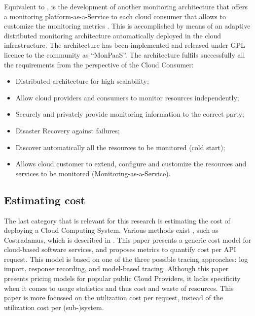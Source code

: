 \noindent
Equivalent to \cite{aktas2018hybrid}, is the development of another monitoring architecture that offers a monitoring platform-as-a-Service to each cloud consumer that allows to customize the monitoring metrics \cite{calero2014monpaas}. This is accomplished by means of an adaptive distributed monitoring architecture automatically deployed in the cloud infrastructure. The architecture has been implemented and released under GPL licence to the community as ``MonPaaS''. The architecture fulfils successfully all the requirements from the perspective of the Cloud Consumer:
\begin{itemize}
    \item Distributed architecture for high scalability;
    \item Allow cloud providers and consumers to monitor resources independently;
    \item Securely and privately provide monitoring information to the correct party;
    \item Disaster Recovery against failures;
    \item Discover automatically all the resources to be monitored (cold start);
    \item Allows cloud customer to extend, configure and customize the resources and services to be monitored (Monitoring-as-a-Service).
\end{itemize}

\subsection{Estimating cost} \label{sec:estimating_cost}
The last category that is relevant for this research is estimating the cost of deploying a Cloud Computing System. Various methods exist \cite{li2009method, leitner2016modelling}, such as Costradamus, which is described in \cite{kuhlenkamp2017costradamus}. This paper presents a generic cost model for cloud-based software services, and proposes metrics to quantify cost per API request. This model is based on one of the three possible tracing approaches: log import, response recording, and model-based tracing. Although this paper presents pricing models for popular public Cloud Providers, it lacks specificity when it comes to usage statistics and thus cost and waste of resources. This paper is more focussed on the utilization cost per request, instead of the utilization cost per (sub-)system.\\


